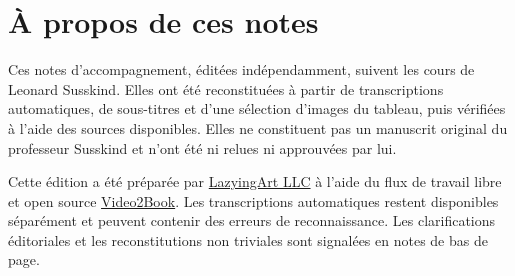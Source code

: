 \documentclass[11pt,oneside]{book}
\begin{document}
\frontmatter
\hypersetup{pageanchor=false}

\hypersetup{pageanchor=true}

\clearpage
\chapter*{À propos de ces notes}
Ces notes d’accompagnement, éditées indépendamment, suivent les cours de Leonard
Susskind. Elles ont été reconstituées à partir de transcriptions automatiques, de sous-titres
et d’une sélection d’images du tableau, puis vérifiées à l’aide des sources
disponibles. Elles ne constituent pas un manuscrit original du professeur Susskind et
n’ont été ni relues ni approuvées par lui.

Cette édition a été préparée par \href{https://lazying.art}{LazyingArt LLC}
à l’aide du flux de travail libre et open source
\href{https://github.com/lachlanchen/Video2Book}{Video2Book}.
Les transcriptions automatiques restent disponibles séparément et peuvent contenir
des erreurs de reconnaissance. Les clarifications éditoriales et les
reconstitutions non triviales sont signalées en notes de bas de page.
\clearpage
\tableofcontents
\mainmatter
\graphicspath{{../../../generated_course_notes/core/special_relativity/2012_spring_theoretical_minimum/chapters/lecture_01/}{../../../generated_course_notes/core/special_relativity/2012_spring_theoretical_minimum/figures/}{../../../generated_course_notes/core/special_relativity/2012_spring_theoretical_minimum/assets/}}

\graphicspath{{../../../generated_course_notes/core/special_relativity/2012_spring_theoretical_minimum/chapters/lecture_02/}{../../../generated_course_notes/core/special_relativity/2012_spring_theoretical_minimum/figures/}{../../../generated_course_notes/core/special_relativity/2012_spring_theoretical_minimum/assets/}}

\graphicspath{{../../../generated_course_notes/core/special_relativity/2012_spring_theoretical_minimum/chapters/lecture_03/}{../../../generated_course_notes/core/special_relativity/2012_spring_theoretical_minimum/figures/}{../../../generated_course_notes/core/special_relativity/2012_spring_theoretical_minimum/assets/}}

\graphicspath{{../../../generated_course_notes/core/special_relativity/2012_spring_theoretical_minimum/chapters/lecture_04/}{../../../generated_course_notes/core/special_relativity/2012_spring_theoretical_minimum/figures/}{../../../generated_course_notes/core/special_relativity/2012_spring_theoretical_minimum/assets/}}
\end{document}
